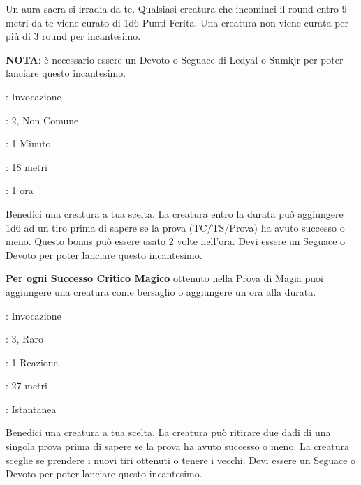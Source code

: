 \begin{multicols}{2}
Un aura sacra si irradia da te. Qualsiasi creatura che incominci il round entro 9 metri da te viene curato di 1d6 Punti Ferita. Una creatura non viene curata per più di 3 round per incantesimo.

\textbf{NOTA}: è necessario essere un Devoto o Seguace di Ledyal o Sumkjr per poter lanciare questo incantesimo.

\noindent\colorbox{OBSSgold!10}{
\begin{minipage}{0.95\linewidth}
\begin{description}[noitemsep, topsep=0pt, parsep=0pt, partopsep=0pt, leftmargin=0cm, labelwidth=1.3cm]
	\item[\textbf{Lista}]: Invocazione
	\item[\textbf{Livello}]: 2, Non Comune
	\item[\textbf{Lancio}]: 1 Minuto
	\item[\textbf{Gittata}]: 18 metri
	\item[\textbf{Durata}]: 1 ora
\end{description}
\end{minipage}}\smallskip

Benedici una creatura a tua scelta. La creatura entro la durata può aggiungere 1d6 ad un tiro prima di sapere se la prova (TC/TS/Prova) ha avuto successo o meno. Questo bonus può essere usato 2 volte nell'ora. Devi essere un Seguace o Devoto per poter lanciare questo incantesimo.

\textbf{Per ogni Successo Critico Magico} ottenuto nella Prova di Magia puoi aggiungere una creatura come bersaglio o aggiungere un ora alla durata.

\noindent\colorbox{OBSSgold!10}{
\begin{minipage}{0.95\linewidth}
\begin{description}[noitemsep, topsep=0pt, parsep=0pt, partopsep=0pt, leftmargin=0cm, labelwidth=1.3cm]
	\item[\textbf{Lista}]: Invocazione
	\item[\textbf{Livello}]: 3, Raro
	\item[\textbf{Lancio}]: 1 Reazione
	\item[\textbf{Gittata}]: 27 metri
	\item[\textbf{Durata}]: Istantanea
\end{description}
\end{minipage}}\smallskip

Benedici una creatura a tua scelta. La creatura può ritirare due dadi di una singola prova prima di sapere se la prova ha avuto successo o meno. La creatura sceglie se prendere i nuovi tiri ottenuti o tenere i vecchi. Devi essere un Seguace o Devoto per poter lanciare questo incantesimo.


\end{multicols}
